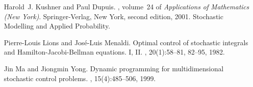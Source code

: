 \documentclass[11pt,reqno]{amsart}
\numberwithin{equation}{section}
\begin{document}
\begin{thebibliography}{10}
Harold~J. Kushner and Paul Dupuis.
, volume~24 of {\em Applications of Mathematics (New York)}.
\newblock Springer-Verlag, New York, second edition, 2001.
\newblock Stochastic Modelling and Applied Probability.

Pierre-Louis Lions and Jos{\'e}-Luis Menaldi.
\newblock Optimal control of stochastic integrals and
  {H}amilton-{J}acobi-{B}ellman equations. {I}, {II}.
, 20(1):58--81, 82--95, 1982.

Jin Ma and Jiongmin Yong.
\newblock Dynamic programming for multidimensional stochastic control problems.
, 15(4):485--506, 1999.

\end{thebibliography}

%
\end{document}
